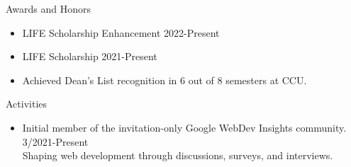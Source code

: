 \documentclass{resume} %
\begin{document}
\begin{rSection}{Awards and Honors}
  \itemsep -1pt {} 
  \begin{itemize}
    \itemsep -7pt {} 
    \item LIFE Scholarship Enhancement \hfill 2022-Present
    \item LIFE Scholarship \hfill 2021-Present
    \item Achieved Dean's List recognition in 6 out of 8 semesters at CCU.
  \end{itemize}
\end{rSection}

\begin{rSection}{Activities}
  \itemsep -1pt {} 
  \begin{itemize}
    \itemsep -7pt {} 
    \item Initial member of the invitation-only Google WebDev Insights community. \hfill 3/2021-Present \\Shaping web development through discussions, surveys, and interviews.
  \end{itemize}
\end{rSection}
\end{document}
